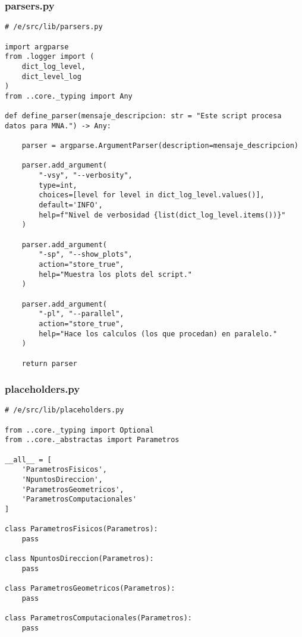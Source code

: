 \subsubsection{parsers.py}
\begin{verbatim}
# /e/src/lib/parsers.py

import argparse
from .logger import (
    dict_log_level,
    dict_level_log
)
from ..core._typing import Any

def define_parser(mensaje_descripcion: str = "Este script procesa datos para MNA.") -> Any:

    parser = argparse.ArgumentParser(description=mensaje_descripcion)

    parser.add_argument(
        "-vsy", "--verbosity",
        type=int,
        choices=[level for level in dict_log_level.values()],
        default='INFO',
        help=f"Nivel de verbosidad {list(dict_log_level.items())}"
    )

    parser.add_argument(
        "-sp", "--show_plots", 
        action="store_true",
        help="Muestra los plots del script."
    )

    parser.add_argument(
        "-pl", "--parallel", 
        action="store_true",
        help="Hace los calculos (los que procedan) en paralelo."
    )
    
    return parser
\end{verbatim}


\subsubsection{placeholders.py}
\begin{verbatim}
# /e/src/lib/placeholders.py

from ..core._typing import Optional
from ..core._abstractas import Parametros

__all__ = [
    'ParametrosFisicos',
    'NpuntosDireccion',
    'ParametrosGeometricos',
    'ParametrosComputacionales'
]

class ParametrosFisicos(Parametros):
    pass

class NpuntosDireccion(Parametros):
    pass

class ParametrosGeometricos(Parametros):
    pass

class ParametrosComputacionales(Parametros):
    pass
\end{verbatim}

